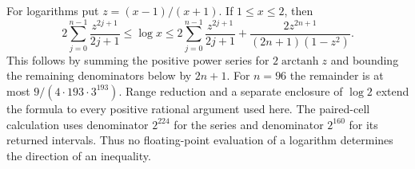 For logarithms put $z=(x-1)/(x+1)$.  If $1\le x\le2$, then
\begin{equation}
 2\sum_{j=0}^{n-1}\frac{z^{2j+1}}{2j+1}
 \le\log x\le
 2\sum_{j=0}^{n-1}\frac{z^{2j+1}}{2j+1}
 +\frac{2z^{2n+1}}{(2n+1)(1-z^2)}.
 \label{num:log-enclosure}
\end{equation}
This follows by summing the positive power series for
$2\operatorname{arctanh}z$ and bounding the remaining denominators
below by $2n+1$.  For $n=96$ the remainder is at most
$9/(4\cdot193\cdot3^{193})$.  Range reduction and a separate
enclosure of $\log2$ extend the formula to every positive rational
argument used here.  The paired-cell calculation uses denominator
$2^{224}$ for the series and denominator $2^{160}$ for its returned
intervals.  Thus no floating-point evaluation of a logarithm determines
the direction of an inequality.
